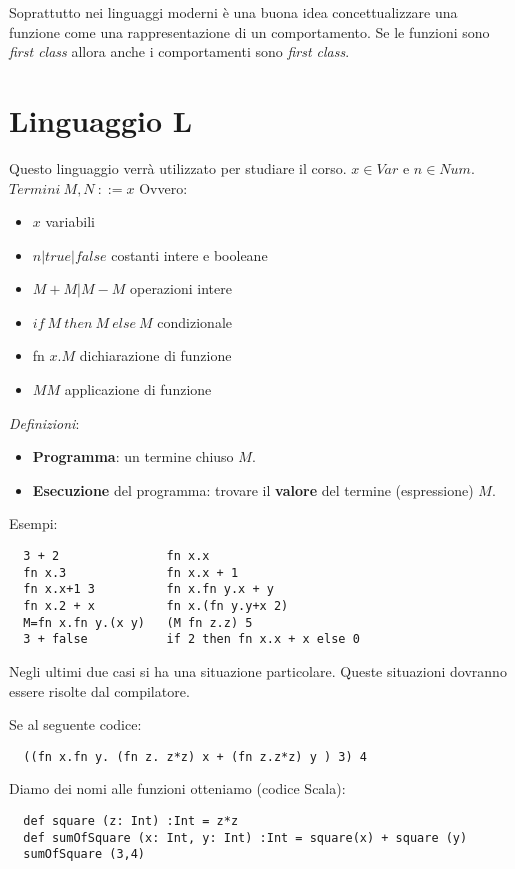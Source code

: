 Soprattutto nei linguaggi moderni è una buona idea concettualizzare una
funzione come una rappresentazione di un comportamento. Se le funzioni sono
\textit{first class} allora anche i comportamenti sono \textit{first class}.

\section{Linguaggio L}
Questo linguaggio verrà utilizzato per studiare il corso.
$x \in Var$ e $n \in Num$.
$Termini\ M,N\ ::= x$
Ovvero:
\begin{itemize}
  \item $x$ variabili
  \item $n | true | false$ costanti intere e booleane
  \item $M + M | M - M$ operazioni intere
  \item $if\ M\ then\ M\ else\ M$ condizionale
  \item fn $x.M$ dichiarazione di funzione
  \item $MM$ applicazione di funzione
\end{itemize}

\textit{Definizioni}:
\begin{itemize}
  \item \textbf{Programma}: un termine chiuso $M$.
  \item \textbf{Esecuzione} del programma: trovare il \textbf{valore} del
termine (espressione) $M$.
\end{itemize}

Esempi:
\begin{verbatim}
  3 + 2               fn x.x
  fn x.3              fn x.x + 1
  fn x.x+1 3          fn x.fn y.x + y
  fn x.2 + x          fn x.(fn y.y+x 2)
  M=fn x.fn y.(x y)   (M fn z.z) 5
  3 + false           if 2 then fn x.x + x else 0
\end{verbatim}
Negli ultimi due casi si ha una situazione particolare. Queste situazioni
dovranno essere risolte dal compilatore.

Se al seguente codice:
\begin{verbatim}
  ((fn x.fn y. (fn z. z*z) x + (fn z.z*z) y ) 3) 4
\end{verbatim}
Diamo dei nomi alle funzioni otteniamo (codice Scala):
\begin{verbatim}
  def square (z: Int) :Int = z*z
  def sumOfSquare (x: Int, y: Int) :Int = square(x) + square (y)
  sumOfSquare (3,4)
\end{verbatim}

